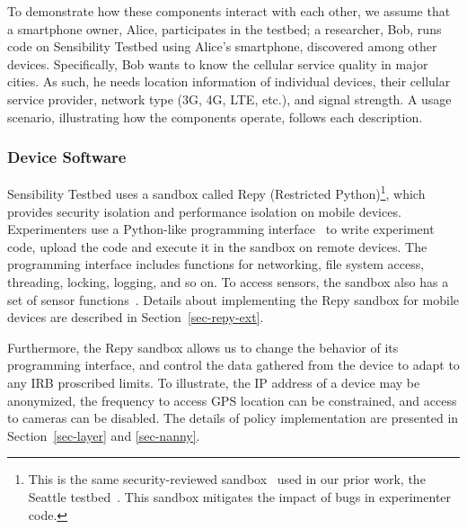 To demonstrate how these components interact with each other, we assume 
that a smartphone owner, Alice, participates in the testbed; a researcher, Bob, 
runs code on Sensibility Testbed using Alice's smartphone, discovered among other
devices. Specifically, Bob wants to know the cellular service
quality in major cities. As such, he needs location information
of individual devices, their cellular service provider, network
type (3G, 4G, LTE, etc.), and signal strength. A usage scenario, 
illustrating how the components operate, follows each description.

\subsubsection{Device Software}\label{sec-repy}

Sensibility Testbed uses a sandbox called Repy (Restricted 
Python)\footnote{\scriptsize This is the 
same security-reviewed sandbox~\cite{cappos2010retaining} used in
our prior work, the Seattle testbed~\cite{seattle}. This sandbox
mitigates the impact of bugs in experimenter code.}, which 
provides security isolation and performance isolation on mobile devices.
Experimenters use a Python-like programming interface~\cite{repyv2}
to write experiment code, upload the code and execute it in the
sandbox on remote devices. The programming interface includes functions for networking, 
file system access, threading, locking, logging, and so on. To access sensors, 
the sandbox also has a set of sensor functions~\cite{sensors}. 
Details about implementing the Repy sandbox for mobile 
devices are described in Section~\ref{sec-repy-ext}.

Furthermore, the Repy sandbox allows us to change the 
behavior of its programming interface, and control the 
data gathered from the device to adapt to any IRB proscribed limits. 
To illustrate, the IP address of a device may be anonymized, 
the frequency to access GPS location can be constrained, and 
access to cameras can be disabled. 
The details of policy implementation are presented in 
Section~\ref{sec-layer} and \ref{sec-nanny}.

